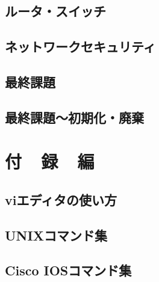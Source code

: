 \documentclass[10pt]{text2002}
\begin{document}
\chapter{ルータ・スイッチ}\label{ch:patch}
\def\chaprouter{03_1_router_sw/}

\def\chapsw{03_1_router_sw/}


\chapter{ネットワークセキュリティ}
\def\chapfw{03_2_firewall/}


\chapter{最終課題}
\def\chapfinal{0Z_final/}


\chapter{最終課題～初期化・廃棄}
\def\chapfinal{0Z_final/}



\part{付~~録~~編}\label{part:appendix}
\appendix
\chapter{viエディタの使い方}\label{etc:vi}


\chapter{UNIXコマンド集}\label{etc:unixcmd}

%
%
%
\chapter{Cisco IOSコマンド集}\label{etc:ioscmd}


%

%

%
\end{document}
